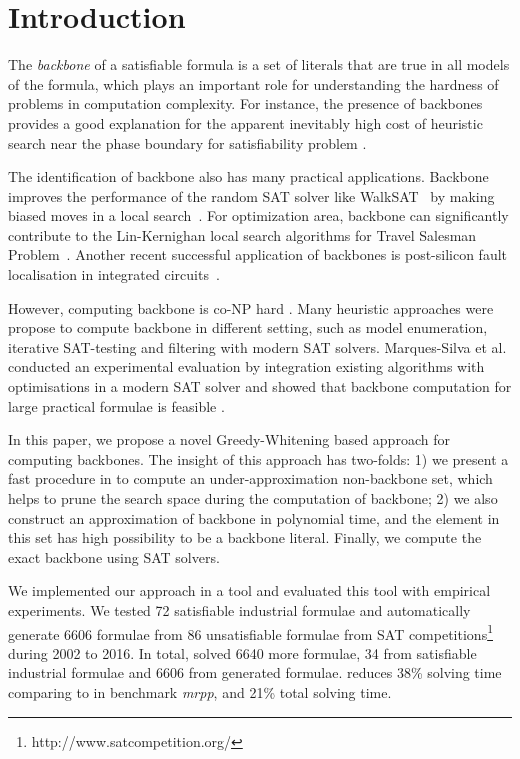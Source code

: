 

\section{Introduction}
The \textit{backbone} of a satisfiable formula is a set of literals that are true in all models of the formula,
which plays an important role for understanding the hardness of problems in computation complexity.
For instance, the presence of backbones provides a good explanation for the apparent inevitably high cost of heuristic search near the phase boundary  for satisfiability problem \cite{MZKST99}.

The identification of backbone also has many practical applications. Backbone improves the performance of the random SAT solver like  WalkSAT~\cite{SBK1993} by making biased moves in a local search~\cite{ZWR2003,MAR2007}. For optimization area,  backbone can significantly contribute to the Lin-Kernighan local search algorithms for Travel Salesman Problem~\cite{ZWL2005}. Another recent successful application of backbones is post-silicon fault localisation in integrated circuits~\cite{ZWSM11,ZWM11}.

However, computing backbone is co-NP hard \cite{Jan10}.  Many heuristic approaches were propose to compute backbone in different setting, such as model enumeration, iterative SAT-testing and filtering with modern SAT solvers.
Marques-Silva et al.  conducted an experimental evaluation by integration existing algorithms with optimisations in a modern SAT solver and showed that backbone computation for large practical formulae is feasible \cite{MJML2010,JLMS12,JLM15}.


In this paper, we propose a novel Greedy-Whitening based approach \tool for computing backbones. The insight of this approach has two-folds: 1) we present a fast procedure in to compute an under-approximation non-backbone set, which helps to prune the search space during the computation of backbone; 2) we also construct an approximation of backbone in polynomial time, and the element in this set has high possibility to be a backbone literal.
Finally, we compute the exact backbone using SAT solvers.

We implemented our approach in a tool \tool and evaluated this tool with empirical experiments. We tested 72 satisfiable industrial formulae and automatically generate 6606 formulae from 86 unsatisfiable formulae from SAT competitions\footnote{http://www.satcompetition.org/} during 2002 to 2016. In total, \tool solved 6640 more formulae, 34 from satisfiable industrial formulae and 6606 from generated formulae. \tool reduces 38\% solving time comparing to \minibones in benchmark \textit{mrpp}, and 21\% total solving time.
